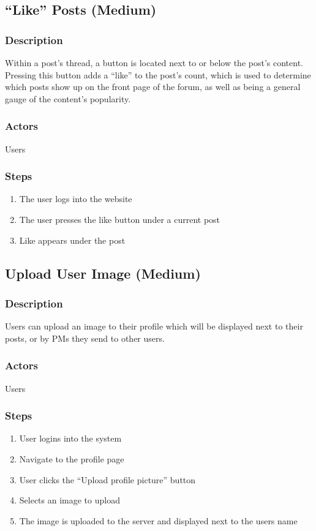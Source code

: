 \documentclass[12pt]{scrartcl}
\begin{document}
\subsection{“Like” Posts (Medium)}
\subsubsection{Description}
Within a post’s thread, a button is located next to or below the post’s content. Pressing this button adds a “like” to the post’s count, which is used to
determine which posts show up on the front page of the forum, as well as being a general gauge of the content’s popularity.

\subsubsection{Actors}
Users
\subsubsection{Steps}

\begin{enumerate}
\item The user logs into the website
\item The user presses the like button under a current post
\item Like appears under the post 
\end{enumerate}


\subsection{Upload User Image (Medium)}
\subsubsection{Description}

Users can upload an image to their profile which will be displayed next to their posts, or by PMs they send to other users.

\subsubsection{Actors}

Users

\subsubsection{Steps}
\begin{enumerate}
\item User logins into the system
\item Navigate to the profile page
\item User clicks the ``Upload profile picture'' button
\item Selects an image to upload
\item The image is uploaded to the server and displayed next to the users name
\end{enumerate}
\end{document}
